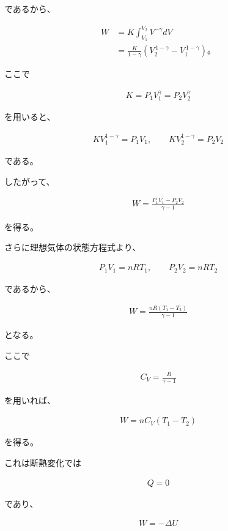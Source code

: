 \documentclass[platex,dvipdfmx,a4paper]{jsarticle}
\begin{document}
であるから、

\begin{align*}
W
&=
K\int_{V_1}^{V_2}V^{-\gamma}dV \\
&=
\frac{K}{1-\gamma}
\left(
V_2^{\,1-\gamma}
-
V_1^{\,1-\gamma}
\right)。
\end{align*}

ここで

\begin{align*}
K=P_1V_1^\gamma
=P_2V_2^\gamma
\end{align*}

を用いると、

\begin{align*}
KV_1^{1-\gamma}
=
P_1V_1,
\qquad
KV_2^{1-\gamma}
=
P_2V_2
\end{align*}

である。

したがって、

\begin{align*}
W
=
\frac{P_1V_1-P_2V_2}{\gamma-1}
\end{align*}

を得る。

さらに理想気体の状態方程式より、

\begin{align*}
P_1V_1=nRT_1,
\qquad
P_2V_2=nRT_2
\end{align*}

であるから、

\begin{align*}
W
=
\frac{nR(T_1-T_2)}{\gamma-1}
\end{align*}

となる。

ここで

\begin{align*}
C_V=\frac{R}{\gamma-1}
\end{align*}

を用いれば、

\begin{align*}
W
=
nC_V(T_1-T_2)
\end{align*}

を得る。

これは断熱変化では

\begin{align*}
Q=0
\end{align*}

であり、

\begin{align*}
W=-\Delta U
\end{align*}
\end{document}
